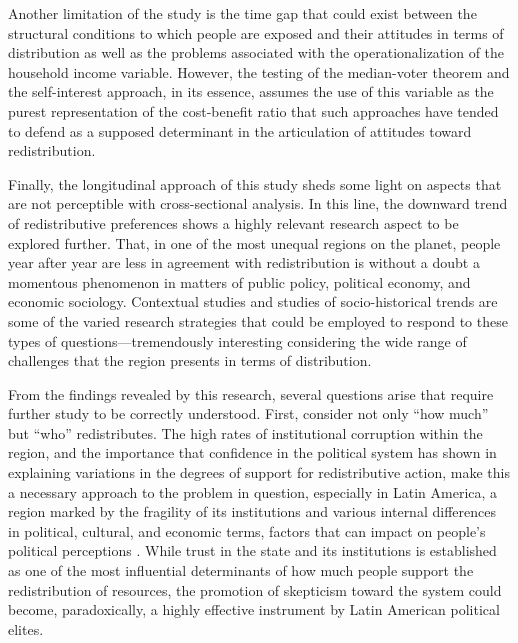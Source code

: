 \documentclass[utf8]{frontiersSCNS} %
\begin{document}
Another limitation of the study is the time gap that could exist between the structural conditions to which people are exposed and their attitudes in terms of distribution  as well as the problems associated with the operationalization of the household income variable. However, the testing of the median-voter theorem and the self-interest approach, in its essence, assumes the use of this variable as the purest representation of the cost-benefit ratio that such approaches have tended to defend as a supposed determinant in the articulation of attitudes toward redistribution.

Finally, the longitudinal approach of this study sheds some light on aspects that are not perceptible with cross-sectional analysis. In this line, the downward trend of redistributive preferences shows a highly relevant research aspect to be explored further. That, in one of the most unequal regions on the planet, people year after year are less in agreement with redistribution is without a doubt a momentous phenomenon in matters of public policy, political economy, and economic sociology. Contextual studies and studies of socio-historical trends are some of the varied research strategies that could be employed to respond to these types of questions—tremendously interesting considering the wide range of challenges that the region presents in terms of distribution.

From the findings revealed by this research, several questions arise that require further study to be correctly understood. First, consider not only “how much” but “who” redistributes. The high rates of institutional corruption within the region, and the importance that confidence in the political system has shown in explaining variations in the degrees of support for redistributive action, make this a necessary approach to the problem in question, especially in Latin America, a region marked by the fragility of its institutions \parencite{portes2010institutions} and various internal differences in political, cultural, and economic terms, factors that can impact on people’s political perceptions \parencite{Stevens2016}. While trust in the state and its institutions is established as one of the most influential determinants of how much people support the redistribution of resources, the promotion of skepticism toward the system could become, paradoxically, a highly effective instrument by Latin American political elites.
\end{document}
